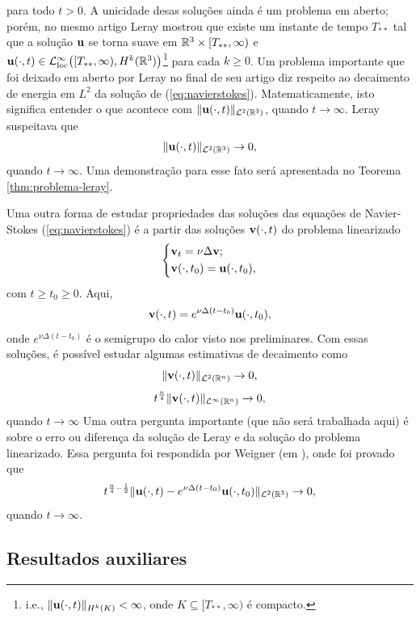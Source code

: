 para todo $t > 0$.
A unicidade desas soluções ainda é um problema em aberto; porém, no mesmo artigo Leray mostrou que existe um instante de tempo $T_{**}$ tal que a solução $\mathbf{u}$ se torna suave em $\mathbb{R}^3 \times [T_{**}, \infty)$ e $\mathbf{u}(\cdot,t) \in \mathcal{L}^{\infty}_{\mathrm{loc}}\big( [T_{**}, \infty), H^k(\mathbb{R}^3) \big)$\footnote{i.e., $\Vert \mathbf{u}(\cdot,t) \Vert_{H^k(K)} < \infty$, onde $K \subseteq [T_{**},\infty)$ é compacto.} para cada $k \geqslant 0$.
Um problema importante que foi deixado em aberto por Leray no final de seu artigo diz respeito ao decaimento de energia em $L^2$ da solução de (\ref{eq:navierstokes}). Matematicamente, isto significa entender o que acontece com $\Vert \mathbf{u}(\cdot,t) \Vert_{\mathcal{L}^2(\mathbb{R}^3)}$, quando $t \to \infty$. Leray suspeitava que
\[
    \Vert \mathbf{u}(\cdot,t) \Vert_{\mathcal{L}^2(\mathbb{R}^3)} \to 0,
\]
quando $t \to \infty$. Uma demonstração para esse fato será apresentada no Teorema \ref{thm:problema-leray}.

Uma outra forma de estudar propriedades das soluções das equações de Navier-Stokes (\ref{eq:navierstokes}) é a partir das soluções $\mathbf{v}(\cdot,t)$ do problema linearizado
\begin{equation} \label{eq:navier-stokes-linearizado}
    \left\{
        \begin{aligned}
        &\mathbf{v}_t = \nu \Delta \mathbf{v};\\
        &\mathbf{v}(\cdot,t_0) = \mathbf{u}(\cdot,t_0),
    \end{aligned}
    \right.
\end{equation}
com $t \geqslant t_0 \geqslant 0$. Aqui, 
\[
    \mathbf{v}(\cdot,t) = e^{\nu \Delta (t-t_0)} \mathbf{u}(\cdot,t_0),
\]
onde $e^{\nu \Delta (t-t_0)}$ é o semigrupo do calor visto nos preliminares.
Com essas soluções, é possível estudar algumas estimativas de decaimento como
\[
    \Vert \mathbf{v}(\cdot,t) \Vert_{\mathcal{L}^2(\mathbb{R}^n)} \to 0,
\]
\[
    t^{\frac{n}{4}}\Vert \mathbf{v}(\cdot,t) \Vert_{\mathcal{L}^\infty(\mathbb{R}^n)} \to 0,
\]
quando $t \to \infty$
Uma outra pergunta importante (que não será trabalhada aqui) é sobre o erro ou diferença da solução de Leray e da solução do problema linearizado.
Essa pergunta foi respondida por Weigner (em \cite{wiegner-decay}), onde foi provado que
\[
    t^{\frac{n}{4} - \frac{1}{2}} \Vert \mathbf{u}(\cdot,t) - e^{\nu \Delta (t-t_0)} \mathbf{u}(\cdot,t_0) \Vert_{\mathcal{L}^2(\mathbb{R}^3)} \to 0,
\]
quando $t \to \infty$.

\subsection{Resultados auxiliares}


